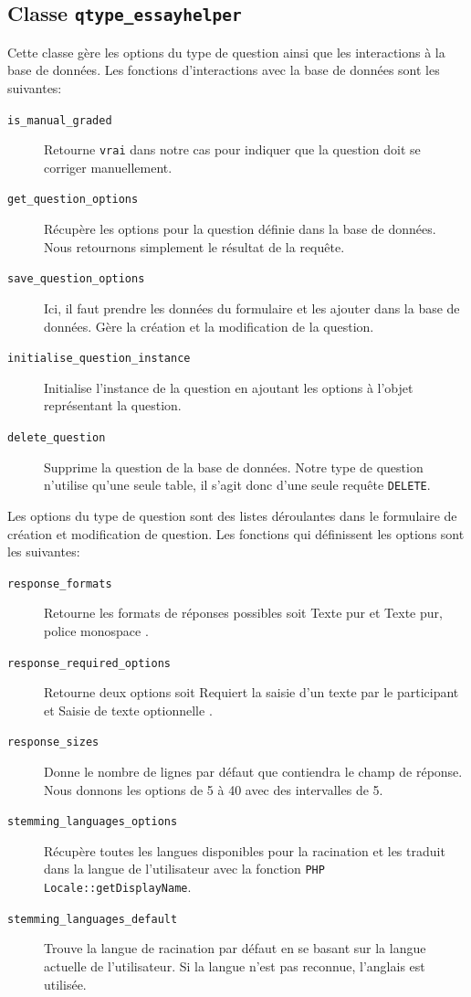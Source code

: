 \subsection*{Classe \texttt{qtype\_essayhelper}}
Cette classe g\`ere les options du type de question ainsi que les interactions \`a la base de donn\'ees.
Les fonctions d'interactions avec la base de donn\'ees sont les suivantes:
\begin{description}
  \item[\texttt{is\_manual\_graded}] Retourne \texttt{vrai} dans notre cas pour indiquer que la question doit se corriger manuellement.
  \item[\texttt{get\_question\_options}] R\'ecup\`ere les options pour la question d\'efinie dans la base de donn\'ees. Nous retournons simplement le r\'esultat de la requ\^ete.
  \item[\texttt{save\_question\_options}] Ici, il faut prendre les donn\'ees du formulaire et les ajouter dans la base de donn\'ees. G\`ere la cr\'eation et la modification de la question.
  \item[\texttt{initialise\_question\_instance}] Initialise l'instance de la question en ajoutant les options \`a l'objet repr\'esentant la question.
  \item[\texttt{delete\_question}] Supprime la question de la base de donn\'ees. Notre type de question n'utilise qu'une seule table, il s'agit donc d'une seule requ\^ete \texttt{DELETE}.
\end{description}
Les options du type de question sont des listes d\'eroulantes dans le formulaire de cr\'eation et modification de question.
Les fonctions qui d\'efinissent les options sont les suivantes:
\begin{description}
  \item[\texttt{response\_formats}] Retourne les formats de r\'eponses possibles soit \og Texte pur \fg{} et \og Texte pur, police monospace \fg{} .
  \item[\texttt{response\_required\_options}] Retourne deux options soit \og Requiert la saisie d'un texte par le participant \fg{} et \og Saisie de texte optionnelle \fg{}.
  \item[\texttt{response\_sizes}] Donne le nombre de lignes par d\'efaut que contiendra le champ de r\'eponse. Nous donnons les options de 5 \`a 40 avec des intervalles de 5.
  \item[\texttt{stemming\_languages\_options}] R\'ecup\`ere toutes les langues disponibles pour la racination et les traduit dans la langue de l'utilisateur avec la fonction \texttt{PHP Locale::getDisplayName}.
  \item[\texttt{stemming\_languages\_default}] Trouve la langue de racination par d\'efaut en se basant sur la langue actuelle de l'utilisateur. Si la langue n'est pas reconnue, l'anglais est utilis\'ee.
\end{description}

